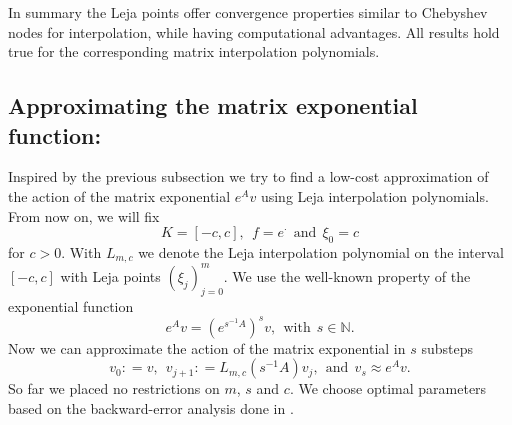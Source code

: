 \documentclass{scrartcl}
\newcommand{\defneq}{\mathrel{\mathop:}=}
\begin{document}
	In summary the Leja points offer convergence properties similar to Chebyshev nodes for interpolation, while having computational advantages. All results hold true for the corresponding matrix interpolation polynomials.
	
	\subsection{Approximating the matrix exponential function:} \label{sec:ApproxMatrixExponential}
	Inspired by the previous subsection we try to find a low-cost approximation of the action of the matrix exponential $e^Av$ using Leja interpolation polynomials. From now on, we will fix 
	\[K=[-c,c], ~~ f = e^\cdot  ~~\text{and}~~ \xi_0 = c \]
	for $c>0$. With $L_{m,c}$ we denote the Leja interpolation polynomial on the interval $[-c,c]$ with Leja points $(\xi_j)_{j=0}^{m}$. We use the well-known property of the exponential function
	\[e^Av = (e^{s^{-1}A})^sv, ~~\text{with}~~ s\in\mathbb{N}.\]
	Now we can approximate the action of the matrix exponential in $s$ substeps
	\[v_0\defneq v, ~~ v_{j+1}\defneq L_{m,c}(s^{-1}A)v_j, ~~\text{and}~~ v_s \approx e^Av.\]
	So far we placed no restrictions on $m$, $s$ and $c$. We choose optimal parameters based on the backward-error analysis done in \cite{lejarev}.
	
\end{document}
